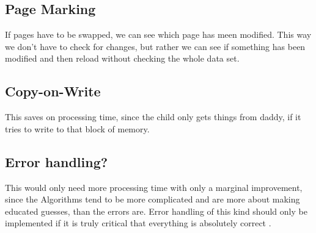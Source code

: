 \documentclass[a4paper, 11pt]{article}
\begin{document}
    \subsection{Page Marking}
    If pages have to be swapped, we can see which page has meen modified. This way we don't have to check for changes, but rather we can see if something has been modified and then reload without checking the whole data set.

    \subsection{Copy-on-Write}
    This saves on processing time, since the child only gets things from daddy, if it tries to write to that block of memory.

    \subsection{Error handling?}
    This would only need more processing time with only a marginal improvement, since the Algorithms tend to be more complicated and are more about making educated guesses, than the errors are.
    Error handling of this kind should only be implemented if it is truly critical that everything is absolutely correct . 
    
\end{document}

